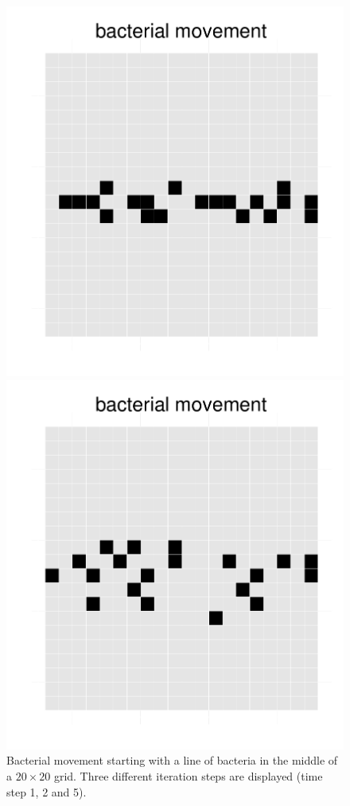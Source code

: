 \begin{figure}[h!]
\begin{minipage}[t]{0.3\textwidth}
    \includegraphics[width=\textwidth]{mov2.pdf}
  \end{minipage}
  \begin{minipage}[t]{0.3\textwidth}
    \includegraphics[width=\textwidth]{mov3.pdf}
  \end{minipage}
  \caption{Bacterial movement starting with a line of bacteria in the middle of a $20\times20$ grid. Three different iteration steps are displayed (time step 1, 2 and 5).}
  \label{fig:mov}
\end{figure}
